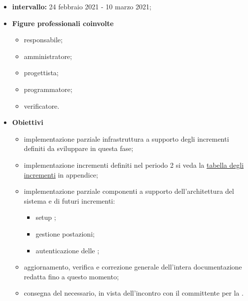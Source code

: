                \begin{itemize}
                    \item \textbf{intervallo: }24 febbraio 2021 - 10 marzo 2021;
                
                \item  \textbf{Figure professionali coinvolte}
                    \begin{itemize}
                        \item responsabile;
                        \item amministratore;
                        \item progettista;
                        \item programmatore;
                        \item verificatore.
                    \end{itemize}
        
                    \item \textbf{Obiettivi}

                                \begin{itemize}
                                    \item implementazione parziale infrastruttura a supporto degli incrementi definiti da sviluppare in questa fase;
                                    \item implementazione incrementi definiti nel periodo 2 si veda la\hypersetup{
                                        linkcolor=blue
                                    }
                                    \hyperlink{TabellaIncrementi}{tabella degli incrementi} in appendice;
                                    \hypersetup{
                                        linkcolor=black
                                    }
                                    \item implementazione parziale componenti a supporto dell'architettura del sistema e di futuri incrementi:
                                            \begin{itemize}
                                                \item setup ;
                                                \item {} gestione postazioni;
                                                \item autenticazione delle ;
                                            \end{itemize}
                                    \item aggiornamento, verifica e correzione generale dell'intera documentazione redatta fino a questo momento;
                                    \item consegna del  necessario, in vista dell'incontro con il committente per la \RP{}.
                                \end{itemize}
                    \end{itemize}
            
